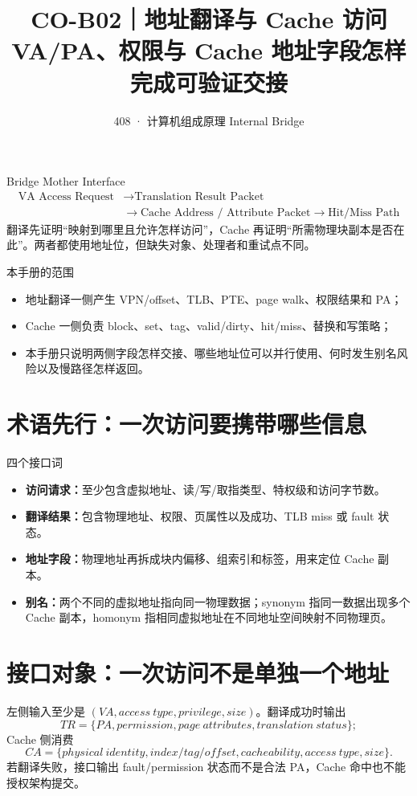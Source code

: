 \documentclass[UTF8,fontset=fandol,11pt,a4paper]{ctexart}
\title{\vspace{-1.1cm}\textbf{CO-B02｜地址翻译与 Cache 访问}\\[0.4em]\large VA/PA、权限与 Cache 地址字段怎样完成可验证交接}
\author{408 · 计算机组成原理 Internal Bridge}
\date{}
\newcommand{\kw}[1]{\textbf{\color{deep}#1}}
\begin{document}
\maketitle

\begin{corebox}{Bridge Mother Interface}
\[
\boxed{
\begin{aligned}
\text{VA Access Request}
&\to\text{Translation Result Packet}\\
&\to\text{Cache Address / Attribute Packet}\to\text{Hit/Miss Path}
\end{aligned}}
\]
翻译先证明“映射到哪里且允许怎样访问”，Cache 再证明“所需物理块副本是否在此”。两者都使用地址位，但缺失对象、处理者和重试点不同。
\end{corebox}

\begin{methodbox}{本手册的范围}
\begin{itemize}
\item 地址翻译一侧产生 VPN/offset、TLB、PTE、page walk、权限结果和 PA；
\item Cache 一侧负责 block、set、tag、valid/dirty、hit/miss、替换和写策略；
\item 本手册只说明两侧字段怎样交接、哪些地址位可以并行使用、何时发生别名风险以及慢路径怎样返回。
\end{itemize}
\end{methodbox}

\section{术语先行：一次访问要携带哪些信息}
\begin{methodbox}{四个接口词}
\begin{itemize}
\item \kw{访问请求：}至少包含虚拟地址、读/写/取指类型、特权级和访问字节数。
\item \kw{翻译结果：}包含物理地址、权限、页属性以及成功、TLB miss 或 fault 状态。
\item \kw{地址字段：}物理地址再拆成块内偏移、组索引和标签，用来定位 Cache 副本。
\item \kw{别名：}两个不同的虚拟地址指向同一物理数据；synonym 指同一数据出现多个 Cache 副本，homonym 指相同虚拟地址在不同地址空间映射不同物理页。
\end{itemize}
\end{methodbox}

\tableofcontents
\newpage

\section{接口对象：一次访问不是单独一个地址}
左侧输入至少是 $(VA,access\ type,privilege,size)$。翻译成功时输出
\[
TR=\{PA,permission,page\ attributes,translation\ status\};
\]
Cache 侧消费
\[
CA=\{physical\ identity,index/tag/offset,cacheability,access\ type,size\}.
\]
若翻译失败，接口输出 fault/permission 状态而不是合法 PA，Cache 命中也不能授权架构提交。
\end{document}
